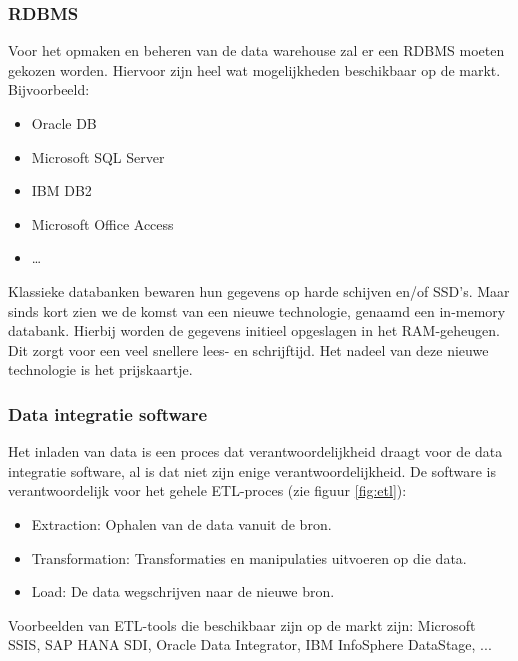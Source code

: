 \subsubsection{RDBMS}
Voor het opmaken en beheren van de data warehouse zal er een RDBMS moeten gekozen worden. Hiervoor zijn heel wat mogelijkheden beschikbaar op de markt. Bijvoorbeeld: 

\begin{itemize}
	\item Oracle DB
	\item Microsoft SQL Server
	\item IBM DB2
	\item Microsoft Office Access
	\item \ldots
\end{itemize} 

Klassieke databanken bewaren hun gegevens op harde schijven en/of SSD's. Maar sinds kort zien we de komst van een nieuwe technologie, genaamd een in-memory databank. Hierbij worden de gegevens initieel opgeslagen in het RAM-geheugen. Dit zorgt voor een veel snellere lees- en schrijftijd. Het nadeel van deze nieuwe technologie is het prijskaartje.

\subsubsection{Data integratie software}
\label{sec:etl}
Het inladen van data is een proces dat verantwoordelijkheid draagt voor de data integratie software, al is dat niet zijn enige verantwoordelijkheid. De software is verantwoordelijk voor het gehele ETL-proces (zie figuur \ref{fig:etl}):

\begin{itemize}
	\item Extraction: Ophalen van de data vanuit de bron.
	\item Transformation: Transformaties en manipulaties uitvoeren op die data.
	\item Load: De data wegschrijven naar de nieuwe bron.
\end{itemize} 

Voorbeelden van ETL-tools die beschikbaar zijn op de markt zijn: Microsoft SSIS, SAP HANA SDI, Oracle Data Integrator, IBM InfoSphere DataStage, ...

